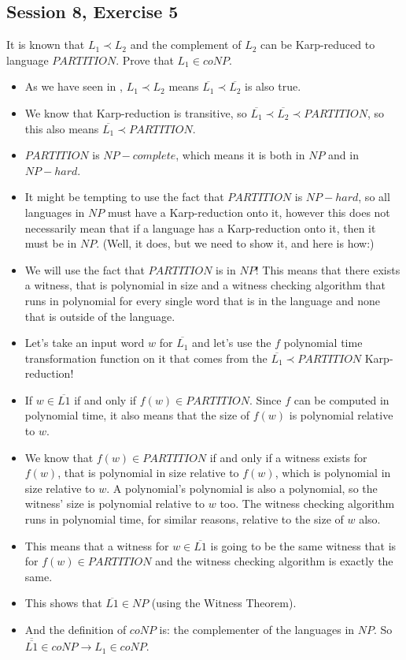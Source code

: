 \subsection {Session 8, Exercise 5}
\label{8f5}


It is known that $L_1 \prec L_2$ and the complement of $L_2$ can be Karp-reduced to language $PARTITION$. Prove that $L_1 \in{} coNP$.


\begin{itemize}
    \item As we have seen in , $L_1 \prec L_2$ means $\overline{L_1} \prec \overline{L_2}$ is also true.
    \item We know that Karp-reduction is transitive, so $\overline{L_1} \prec \overline{L_2} \prec PARTITION$, so this also means $\overline{L_1} \prec PARTITION$.
    \item $PARTITION$ is $NP-complete$, which means it is both in $NP$ and in $NP-hard$.
    \item It might be tempting to use the fact that $PARTITION$ is $NP-hard$, so all languages in $NP$ must have a Karp-reduction onto it, however this does not necessarily mean that if a language has a Karp-reduction onto it, then it must be in $NP$. (Well, it does, but we need to show it, and here is how:)
    \item We will use the fact that $PARTITION$ is in $NP$! This means that there exists a witness, that is polynomial in size and a witness checking algorithm that runs in polynomial for every single word that is in the language and none that is outside of the language.
    \item Let's take an input word $w$ for $\overline{L_1}$ and let's use the $f$ polynomial time transformation function on it that comes from the $\overline{L_1} \prec PARTITION$ Karp-reduction!
    \item If $w \in{} \overline{L1}$ if and only if $f(w)\in{}PARTITION$. Since $f$ can be computed in polynomial time, it also means that the size of $f(w)$ is polynomial relative to $w$.
    \item We know that $f(w)\in{}PARTITION$ if and only if a witness exists for $f(w)$, that is polynomial in size relative to $f(w)$, which is polynomial in size relative to $w$. A polynomial's polynomial is also a polynomial, so the witness' size is polynomial relative to $w$ too. The witness checking algorithm runs in polynomial time, for similar reasons, relative to the size of $w$ also.
    \item This means that a witness for $w\in{}\overline{L1}$ is going to be the same witness that is for $f(w)\in{}PARTITION$ and the witness checking algorithm is exactly the same.
    \item This shows that $\overline{L1} \in{} NP$ (using the Witness Theorem).
    \item And the definition of $coNP$ is: the complementer of the languages in $NP$. So $\overline{\overline{L1}} \in{} coNP \rightarrow L_1 \in{} coNP$. 
\end{itemize}
